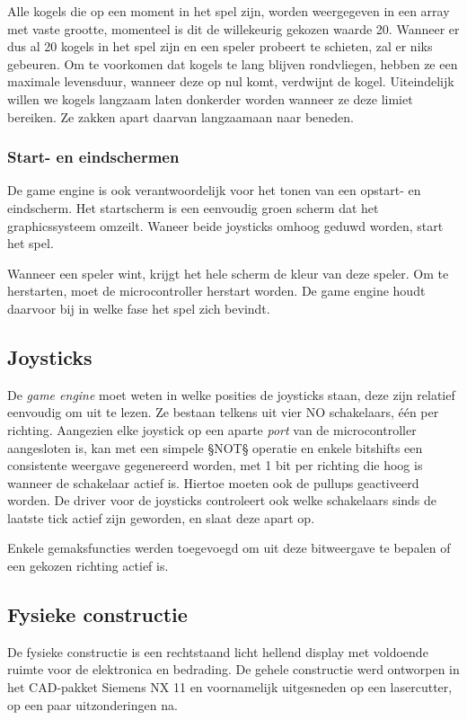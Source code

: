 \documentclass[12pt]{ugentreport}
\begin{document}
Alle kogels die op een moment in het spel zijn, worden weergegeven in een array
met vaste grootte, momenteel is dit de willekeurig gekozen waarde 20. Wanneer
er dus al 20 kogels in het spel zijn en een speler probeert te schieten, zal er
niks gebeuren. Om te voorkomen
dat kogels te lang blijven rondvliegen, hebben ze een maximale levensduur,
wanneer deze op nul komt, verdwijnt de kogel. Uiteindelijk willen we kogels
langzaam laten donkerder worden wanneer ze deze limiet bereiken. Ze zakken apart
daarvan langzaamaan naar beneden.

\subsubsection{Start- en eindschermen}
De game engine is ook verantwoordelijk voor het tonen van een opstart- en
eindscherm. Het startscherm is een eenvoudig groen scherm dat het
graphicssysteem omzeilt. Waneer beide joysticks omhoog geduwd worden, start het
spel.

Wanneer een speler wint, krijgt het hele scherm de kleur van deze speler. Om te
herstarten, moet de microcontroller herstart worden. De game engine houdt
daarvoor bij in welke fase het spel zich bevindt.

\subsection{Joysticks}
De \emph{game engine} moet weten in welke posities de joysticks staan,
deze zijn relatief eenvoudig om uit te lezen.
Ze bestaan telkens uit vier NO schakelaars, één per richting.
Aangezien elke joystick op een aparte \emph{port} van de microcontroller
aangesloten is, kan met een simpele §NOT§ operatie en enkele bitshifts een
consistente weergave gegenereerd worden, met 1 bit per richting die hoog is
wanneer de schakelaar actief is. Hiertoe moeten ook de pullups geactiveerd
worden. De driver voor de joysticks controleert ook welke schakelaars sinds de
laatste tick actief zijn geworden, en slaat deze apart op.

Enkele gemaksfuncties werden toegevoegd om uit deze bitweergave te bepalen of
een gekozen richting actief is.

\subsection{Fysieke constructie}
De fysieke constructie is een rechtstaand licht hellend display met voldoende
ruimte voor de elektronica en bedrading. De gehele constructie werd ontworpen
in het CAD-pakket Siemens NX 11 en voornamelijk uitgesneden op een lasercutter,
op een paar uitzonderingen na.
\end{document}
